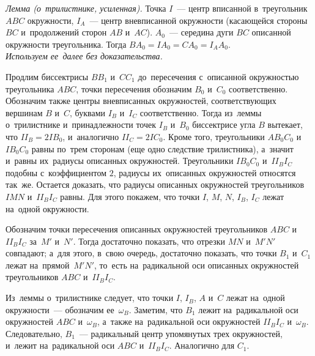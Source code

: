 \ifincludesolutions
\begin{figure}[ht]\begin{center}
\end{center}\end{figure}
\emph{Лемма (о~трилистнике, усиленная).}
Точка $I$~--- центр вписанной в~треугольник $ABC$ окружности, $I_A$~--- центр
вневписанной окружности (касающейся стороны~$BC$ и~продолжений сторон
$AB$ и~$AC$).
$A_0$~--- середина дуги $BC$ описанной окружности треугольника.
Тогда $B A_0 = I A_0 = C A_0 = I_A A_0$.
\\
\emph{Используем ее~далее без доказательства.}
\par
Продлим биссектрисы $BB_1$ и~$CC_1$ до~пересечения с~описанной окружностью
треугольника $ABC$, точки пересечения обозначим $B_0$ и~$C_0$ соответственно.
Обозначим также центры вневписанных окружностей, соответствующих вершинам $B$
и~$C$, буквами $I_B$ и~$I_C$ соответственно.
Тогда из~леммы о~трилистнике и~принадлежности точек $I_B$ и~$B_0$ биссектрисе
угла $B$ вытекает, что $II_B = 2IB_0$, и~аналогично $II_C = 2IC_0$.
Кроме того, треугольники $AB_0C_0$ и~$IB_0C_0$ равны по~трем сторонам (еще одно
следствие трилистника), а~значит и~равны их~радиусы описанных окружностей.
Треугольники $IB_0C_0$ и~$II_BI_C$ подобны с~коэффициентом $2$, радиусы их~описанных окружностей относятся так~же.
Остается доказать, что радиусы описанных окружностей треугольников $IMN$ и~$II_BI_C$ равны.
Для этого покажем, что точки $I$, $M$, $N$, $I_B$, $I_C$ лежат на~одной
окружности.
\par
Обозначим точки пересечения описанных окружностей треугольников $ABC$
и~$I I_B I_C$ за~$M'$ и~$N'$.
Тогда достаточно показать, что отрезки $M N$ и~$M'N'$ совпадают;
а~для этого, в~свою очередь, достаточно показать, что точки $B_1$ и~$C_1$ лежат
на~прямой~$M'N'$, то~есть на~радикальной оси описанных окружностей
треугольников $ABC$ и~$I I_B I_C$.
\par
Из~леммы о~трилистнике следует, что точки $I$, $I_B$, $A$ и~$C$ лежат на~одной
окружности~--- обозначим ее~$\omega_B$.
Заметим, что $B_1$ лежит на~радикальной оси окружностей $ABC$ и~$\omega_B$,
а~также на~радикальной оси окружностей $I I_B I_C$ и~$\omega_B$.
Следовательно, $B_1$~--- радикальный центр упомянутых трех окружностей,
и~лежит на~радикальной оси $ABC$ и~$I I_B I_C$.
Аналогично для $C_1$.
\fi %

\endgroup %

\endgroup %

